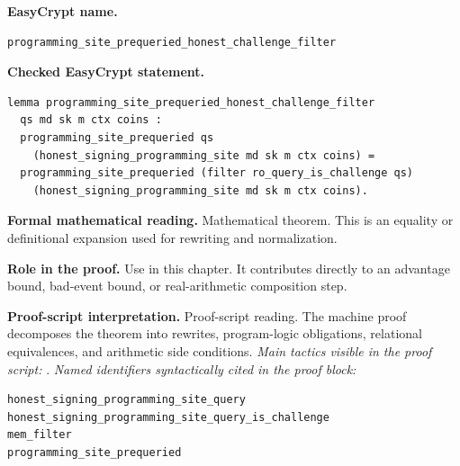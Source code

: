 \begin{formaltheorem}
\noindent\textbf{EasyCrypt name.}
\begin{lstlisting}[language=EasyCrypt,basicstyle=\ttfamily\scriptsize]
programming_site_prequeried_honest_challenge_filter
\end{lstlisting}
\noindent\textbf{Checked EasyCrypt statement.}
\begin{lstlisting}[language=EasyCrypt,basicstyle=\ttfamily\scriptsize]
lemma programming_site_prequeried_honest_challenge_filter
  qs md sk m ctx coins :
  programming_site_prequeried qs
    (honest_signing_programming_site md sk m ctx coins) =
  programming_site_prequeried (filter ro_query_is_challenge qs)
    (honest_signing_programming_site md sk m ctx coins).
\end{lstlisting}
\noindent\textbf{Formal mathematical reading.}
Mathematical theorem. This is an equality or definitional expansion used for rewriting and normalization.

\noindent\textbf{Role in the proof.}
Use in this chapter. It contributes directly to an advantage bound, bad-event bound, or real-arithmetic composition step.

\noindent\textbf{Proof-script interpretation.}
Proof-script reading. The machine proof decomposes the theorem into rewrites, program-logic obligations, relational equivalences, and arithmetic side conditions.
\emph{Main tactics visible in the proof script:} .
\emph{Named identifiers syntactically cited in the proof block:}
\begin{lstlisting}[language=EasyCrypt,basicstyle=\ttfamily\scriptsize]
honest_signing_programming_site_query
honest_signing_programming_site_query_is_challenge
mem_filter
programming_site_prequeried
\end{lstlisting}

\end{formaltheorem}

